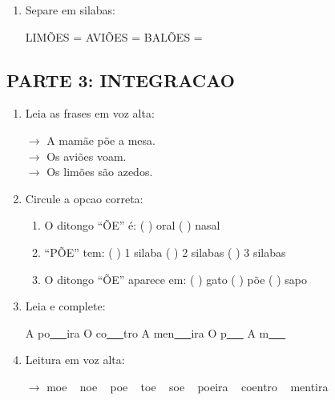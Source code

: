 \begin{exercicio}
\begin{enumerate}[resume]
  \item Separe em silabas:
  \begin{center}
  LIM\~OES = \underline{\hspace{1cm}} \underline{\hspace{1cm}} \quad AVI\~OES = \underline{\hspace{1cm}} \underline{\hspace{1cm}} \underline{\hspace{1cm}} \quad BAL\~OES = \underline{\hspace{1cm}} \underline{\hspace{1cm}}
  \end{center}
\end{enumerate}

\subsection*{PARTE 3: INTEGRACAO}

\begin{enumerate}[resume]
  \item Leia as frases em voz alta:
  \begin{center}
  $\rightarrow$ A mam\~ae p\~oe a mesa.\\
  $\rightarrow$ Os avi\~oes voam.\\
  $\rightarrow$ Os lim\~oes s\~ao azedos.
  \end{center}

  \item Circule a opcao correta:
  \begin{enumerate}[label=(\alph*)]
    \item O ditongo ``\~OE'' \'e: ( ) oral ( ) nasal
    \item ``P\~OE'' tem: ( ) 1 silaba ( ) 2 silabas ( ) 3 silabas
    \item O ditongo ``\~OE'' aparece em: ( ) gato ( ) p\~oe ( ) sapo
  \end{enumerate}

  \item Leia e complete:
  \begin{center}
  A po\underline{~~~}ira \quad O co\underline{~~~}tro \quad A men\underline{~~~}ira \quad O p\underline{~~~} \quad A m\underline{~~~}
  \end{center}

  \item Leitura em voz alta:
  \begin{center}
  $\rightarrow$ moe  ~  noe  ~  poe  ~  toe  ~  soe  ~  poeira  ~  coentro  ~  mentira
  \end{center}
\end{enumerate}
\end{exercicio}

